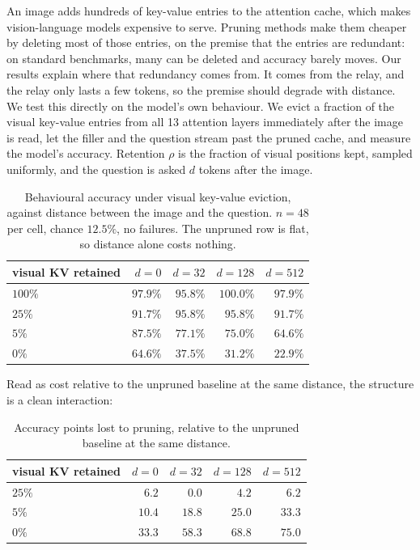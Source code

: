\documentclass{article}
\begin{document}
An image adds hundreds of key-value entries to the attention cache, which
makes vision-language models expensive to serve. Pruning methods make them
cheaper by deleting most of those entries, on the premise that the entries
are redundant: on standard benchmarks, many can be deleted and accuracy
barely moves. Our results explain where that redundancy comes from. It comes
from the relay, and the relay only lasts a few tokens, so the premise should
degrade with distance. We test this directly on the model's own behaviour. We
evict a fraction of the visual key-value entries from all 13 attention layers
immediately after the image is read, let the filler and the question stream
past the pruned cache, and measure the model's accuracy. Retention $\rho$ is
the fraction of visual positions kept, sampled uniformly, and the question is
asked $d$ tokens after the image.

\begin{table}[h]
\centering\small
\begin{tabular}{lrrrr}
\toprule
visual KV retained & $d{=}0$ & $d{=}32$ & $d{=}128$ & $d{=}512$ \\
\midrule
$100\%$ & $97.9\%$ & $95.8\%$ & $100.0\%$ & $97.9\%$ \\
$25\%$  & $91.7\%$ & $95.8\%$ & $95.8\%$  & $91.7\%$ \\
$5\%$   & $87.5\%$ & $77.1\%$ & $75.0\%$  & $64.6\%$ \\
$0\%$   & $64.6\%$ & $37.5\%$ & $31.2\%$  & $22.9\%$ \\
\bottomrule
\end{tabular}
\caption{Behavioural accuracy under visual key-value eviction, against distance
between the image and the question. $n = 48$ per cell, chance $12.5\%$, no
failures. The unpruned row is flat, so distance alone costs nothing.}
\label{tab:eviction}
\end{table}

Read as cost relative to the unpruned baseline at the same distance, the
structure is a clean interaction:

\begin{table}[h]
\centering\small
\begin{tabular}{lrrrr}
\toprule
visual KV retained & $d{=}0$ & $d{=}32$ & $d{=}128$ & $d{=}512$ \\
\midrule
$25\%$ & $6.2$  & $0.0$  & $4.2$  & $6.2$ \\
$5\%$  & $10.4$ & $18.8$ & $25.0$ & $33.3$ \\
$0\%$  & $33.3$ & $58.3$ & $68.8$ & $75.0$ \\
\bottomrule
\end{tabular}
\caption{Accuracy points lost to pruning, relative to the unpruned baseline at
the same distance.}
\label{tab:eviction_cost}
\end{table}
\end{document}

